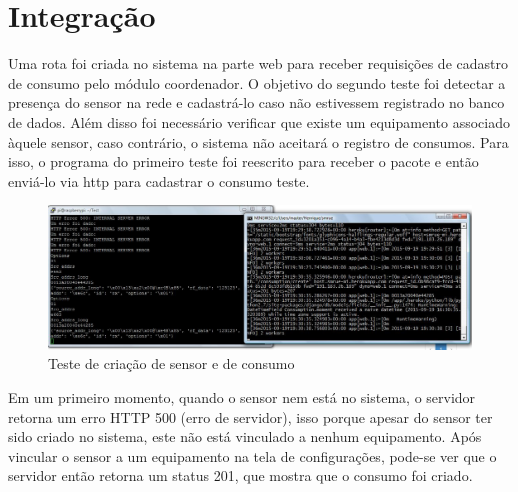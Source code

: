 \section{Integração}
Uma rota foi criada no sistema na parte web para receber requisições de cadastro de consumo pelo módulo coordenador. O objetivo do segundo teste foi detectar a presença do sensor na rede e cadastrá-lo caso não estivessem registrado no banco de dados. Além disso foi necessário verificar que existe um equipamento associado àquele sensor, caso contrário, o sistema não aceitará o registro de consumos.
Para isso, o programa do primeiro teste foi reescrito para receber o pacote e então enviá-lo via http para cadastrar o consumo teste.

\begin{figure}[H]
\centering
\includegraphics[width=1\textwidth]{figuras/sensor_creation.jpg}
\caption{\label{fig:sensor_creation} Teste de criação de sensor e de consumo }
\end{figure}

Em um primeiro momento, quando o sensor nem está no sistema,  o servidor retorna um erro HTTP 500 (erro de servidor), isso porque apesar do sensor ter sido criado no sistema, este não está vinculado a nenhum equipamento. Após vincular o sensor a um equipamento na tela de configurações, pode-se ver que o servidor então retorna um status 201, que mostra que o consumo foi criado.